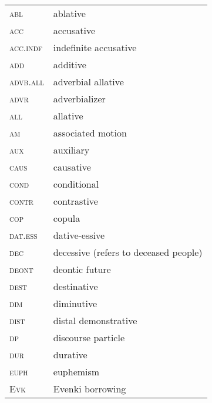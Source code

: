 \documentclass[output=paper]{langscibook}
\begin{document}
\begin{tabularx}{.45\textwidth}{lQ}
\textsc{abl} & ablative\\
\textsc{acc} & accusative\\
\textsc{acc.indf} & indefinite accusative\\
\textsc{add} & additive\\
\textsc{advb.all} & adverbial allative\\
\textsc{advr} & adverbializer\\
\textsc{all} & allative\\
\textsc{am} & associated motion\\
\textsc{aux} & auxiliary\\
\textsc{caus} & causative\\
\textsc{cond} & conditional\\
\textsc{contr} & contrastive\\
\textsc{cop} & copula\\
\textsc{dat.ess} & dative-essive\\
\textsc{dec} & decessive (refers to deceased people)\\
\textsc{deont} & deontic future\\
\textsc{dest} & destinative\\
\textsc{dim} & diminutive\\
\textsc{dist}  & distal demonstrative\\
\textsc{dp} & discourse particle\\
\textsc{dur} & durative\\
\textsc{euph} & euphemism\\
\textsc{Evk} & Evenki borrowing\\
\end{tabularx}
\end{document}
